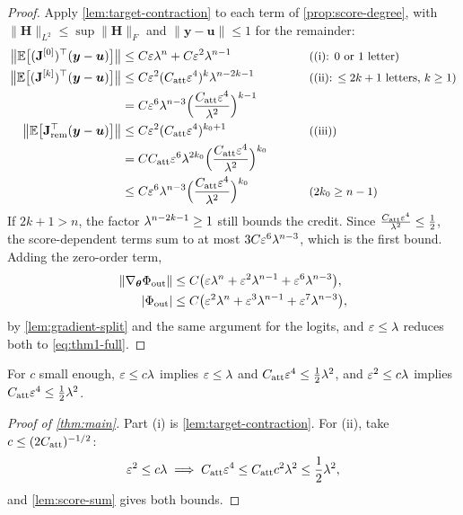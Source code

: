 \begin{proof}
Apply \cref{lem:target-contraction} to each term of \cref{prop:score-degree}, with $\|\mathbf H\|_{L^2}\le\sup\|\mathbf H\|_F$ and $\|\bm y-\bm u\|\le1$ for the remainder:
\begin{alignat*}{2}
 \bigl\|\E\bigl[(\mathbf J^{[0]})^\top(\bm y-\bm u)\bigr]\bigr\|&\le C\initscale\mixrate^n+C\initscale^2\mixrate^{n-1} &\qquad& \why{(i): $0$ or $1$ letter}\\
 \bigl\|\E\bigl[(\mathbf J^{[k]})^\top(\bm y-\bm u)\bigr]\bigr\|&\le C\initscale^2(\attconst\initscale^4)^k\mixrate^{n-2k-1} && \why{(ii): $\le2k+1$ letters, $k\ge1$}\\
 &=C\initscale^6\mixrate^{n-3}\Bigl(\frac{\attconst\initscale^4}{\mixrate^2}\Bigr)^{k-1} && \\
 \bigl\|\E\bigl[\mathbf J_{\mathrm{rem}}^\top(\bm y-\bm u)\bigr]\bigr\|&\le C\initscale^2(\attconst\initscale^4)^{k_0+1} && \why{(iii)}\\
 &=C\attconst\initscale^6\mixrate^{2k_0}\Bigl(\frac{\attconst\initscale^4}{\mixrate^2}\Bigr)^{k_0} && \\
 &\le C\initscale^6\mixrate^{n-3}\Bigl(\frac{\attconst\initscale^4}{\mixrate^2}\Bigr)^{k_0} && \why{$2k_0\ge n-1$}
\end{alignat*}
If $2k+1>n$, the factor $\lambda^{n-2k-1}\ge1$ still bounds the credit. Since $\frac{C_{\mathrm{att}}\varepsilon^4}{\lambda^2}\le\frac{1}{2}$, the
score-dependent terms sum to at most $3C\varepsilon^6\lambda^{n-3}$, which is the first bound. Adding the zero-order term,
\begin{align*}
 \|\nabla_{\bm\theta}\Phi_{\mathrm{out}}\|&\le C\bigl(\varepsilon\lambda^n+\varepsilon^2\lambda^{n-1}+\varepsilon^6\lambda^{n-3}\bigr),\\
 |\Phi_{\mathrm{out}}|&\le C\bigl(\varepsilon^2\lambda^n+\varepsilon^3\lambda^{n-1}+\varepsilon^7\lambda^{n-3}\bigr),
\end{align*}
by \cref{lem:gradient-split} and the same argument for the logits, and $\varepsilon\le\lambda$ reduces both to \cref{eq:thm1-full}.
\end{proof}

For $c$ small enough, $\varepsilon\le c\lambda$ implies $\varepsilon\le\lambda$ and $C_{\mathrm{att}}\varepsilon^4\le\frac{1}{2}\lambda^2$, and $\varepsilon^2\le c\lambda$ implies $C_{\mathrm{att}}\varepsilon^4\le\frac{1}{2}\lambda^2$.

\begin{proof}[Proof of \cref{thm:main}]
Part (i) is \cref{lem:target-contraction}. For (ii), take $c\le(2C_{\mathrm{att}})^{-1/2}$:
\[
 \initscale^2\le c\mixrate\implies \attconst\initscale^4\le\attconst c^2\mixrate^2\le\tfrac{1}{2}\mixrate^2,
\]
and \cref{lem:score-sum} gives both bounds.
\end{proof}

